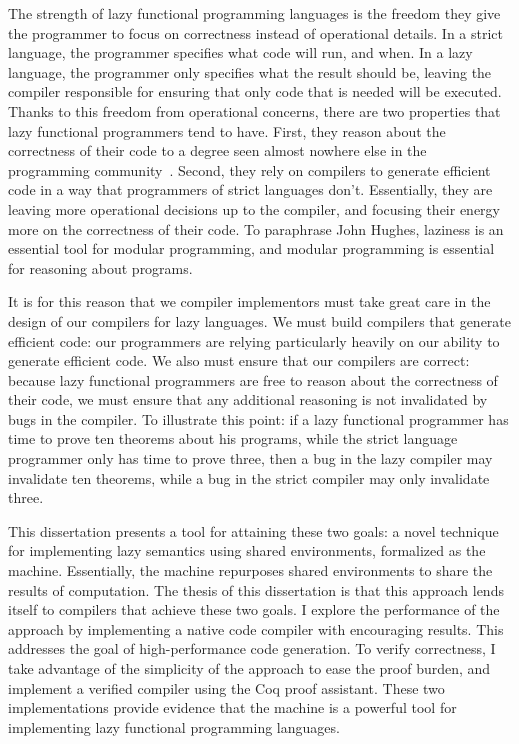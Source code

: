 The strength of lazy functional programming languages is the freedom they give
the programmer to focus on correctness instead of operational details. In a
strict language, the programmer specifies what code will run, and when. In a
lazy language, the programmer only specifies what the result should be, leaving
the compiler responsible for ensuring that only code that is needed will be
executed. Thanks to this freedom from operational concerns, there are two
properties that lazy functional programmers tend to have. First, they reason
about the correctness of their code to a degree seen almost nowhere else in the
programming community~\cite{hughes1989functional, spector2018total}.  Second,
they rely on compilers to generate efficient code in a way that programmers of
strict languages don't. Essentially, they are leaving more operational decisions
up to the compiler, and focusing their energy more on the correctness of their
code. To paraphrase John Hughes, laziness is an essential tool for modular
programming, and modular programming is essential for reasoning about programs. 

It is for this reason that we compiler implementors must take great care in the
design of our compilers for lazy languages. We must build compilers that
generate efficient code: our programmers are relying particularly heavily on
our ability to generate efficient code. We also must ensure that our compilers
are correct: because lazy functional programmers are free to reason about the
correctness of their code, we must ensure that any additional reasoning is not
invalidated by bugs in the compiler. To illustrate this point: if a lazy
functional programmer has time to prove ten theorems about his programs, while
the strict language programmer only has time to prove three, then a bug in the
lazy compiler may invalidate ten theorems, while a bug in the strict compiler
may only invalidate three.

This dissertation presents a tool for attaining these two goals: a novel
technique for implementing lazy semantics using shared environments, formalized
as the \ce machine. Essentially, the \ce machine repurposes shared environments
to share the results of computation. The thesis of this dissertation is that
this approach lends itself to compilers that achieve these two goals. I explore
the performance of the approach by implementing a native code compiler with
encouraging results. This addresses the goal of high-performance code
generation. To verify correctness, I take advantage of the simplicity of the
approach to ease the proof burden, and implement a verified compiler using the
Coq proof assistant. These two implementations provide evidence that the \ce
machine is a powerful tool for implementing lazy functional programming
languages.

